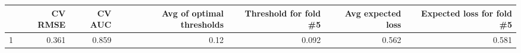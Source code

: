 
\begin{tabular}{lrrrrrr}
\toprule
  & CV RMSE & CV AUC & Avg of optimal thresholds & Threshold for fold \#5 & Avg expected loss & Expected loss for fold \#5\\
\midrule
1 & 0.361 & 0.859 & 0.12 & 0.092 & 0.562 & 0.581\\
\bottomrule
\end{tabular}